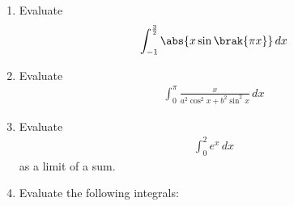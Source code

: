 \begin{enumerate}[label=\arabic*.,ref=\thesubsection.\theenumi]
%
\item Evaluate
\begin{align}
\int_{-1}^{\frac{3}{2}}\abs{x\sin \brak{\pi x}} \,dx
\end{align}
%
\item Evaluate
\begin{align}
\int_{0}^{\pi}\frac{x}{a^2\cos^2x + b^2\sin^2x} \,dx
\end{align}
%
\item Evaluate
\begin{align}
\int_{0}^{2} e^x\,dx
\end{align}
%
as a limit of a sum.
%
\item Evaluate the following integrals:

\end{enumerate}
